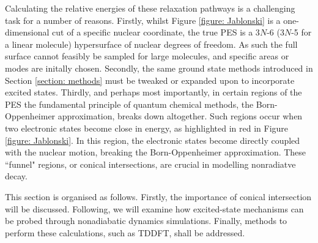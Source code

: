 Calculating the relative energies of these relaxation pathways is a challenging task for a number of reasons. Firstly, whilst Figure \ref{figure: Jablonski} is a one-dimensional cut of a specific nuclear coordinate, the true \ac{PES} is a 3$N$-6 (3$N$-5 for a linear molecule) hypersurface of nuclear degrees of freedom. As such the full surface cannot feasibly be sampled for large molecules, and specific areas or modes are initally chosen. Secondly, the same ground state methods introduced in Section \ref{section: methods} must be tweaked or expanded upon to incorporate excited states. Thirdly, and perhaps most importantly, in certain regions of the \ac{PES} the fundamental principle of quantum chemical methods, the Born-Oppenheimer approximation, breaks down altogether. Such regions occur when two electronic states become close in energy, as highlighted in red in Figure \ref{figure: Jablonski}. In this region, the electronic states become directly coupled with the nuclear motion, breaking the Born-Oppenheimer approximation. These ``funnel" regions, or conical intersections, are crucial in modelling nonradiatve decay.

This section is organised as follows. Firstly, the importance of conical intersection will be discussed. Following, we will examine how excited-state mechanisms can be probed through nonadiabatic dynamics simulations. Finally, methods to perform these calculations, such as \acf{TDDFT}, shall be addressed. 
